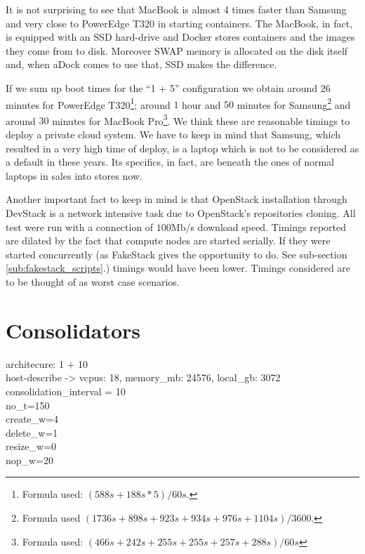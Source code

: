 It is not surprising to see that MacBook is almost 4 times faster than Samsung and very close to PowerEdge T320 in starting containers. The MacBook, in fact, is equipped with an SSD hard-drive and Docker stores containers and the images they come from to disk. Moreover SWAP memory is allocated on the disk itself and, when aDock comes to use that, SSD makes the difference.

If we sum up boot times for the ``1 + 5'' configuration we obtain around $26$ minutes for PowerEdge T320\footnote{Formula used: $(588s + 188s * 5) / 60s$.}; around $1$ hour and $50$ minutes for Samsung\footnote{Formula used $(1736s + 898s + 923s + 934s + 976s + 1104s) / 3600$.} and around $30$ minutes for MacBook Pro\footnote{Formula used: $(466s + 242s + 255s + 255s + 257s + 288s) / 60s$}. We think these are reasonable timings to deploy a private cloud system. We have to keep in mind that Samsung, which resulted in a very high time of deploy, is a laptop which is not to be considered as a default in these years. Its specifics, in fact, are beneath the ones of normal laptops in sales into stores now.

Another important fact to keep in mind is that OpenStack installation through DevStack is a network intensive task due to OpenStack's repositories cloning. All test were run with a connection of $100$Mb/s download speed.
Timings reported are dilated by the fact that compute nodes are started serially. If they were started concurrently (as FakeStack gives the opportunity to do. See sub-section \ref{sub:fakestack_scripts}.) timings would have been lower. Timings considered are to be thought of as worst case scenarios.

\section{Consolidators}
\label{sec:eval_cons}
\newcommand{\allownewline}[2][c]{\begin{tabular}[#1]{@{}c@{}}#2\end{tabular}}

architecure: 1 + 10\\
host-describe -> vcpus: 18, memory\_mb: 24576, local\_gb: 3072\\

consolidation\_interval = 10\\
no\_t=150\\
create\_w=4\\
delete\_w=1\\
resize\_w=0\\
nop\_w=20\\

